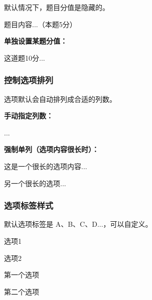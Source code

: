 默认情况下，题目分值是隐藏的。

\begin{latexcode}

  \begin{question}[points = 5]
    题目内容...（本题5分）
  \end{question}
\end{latexcode}

\textbf{单独设置某题分值：}

\begin{latexcode}
  \begin{question}[points = 10]
    这道题10分...
  \end{question}
\end{latexcode}

\subsubsection{控制选项排列}

选项默认会自动排列成合适的列数。

\textbf{手动指定列数：}

\begin{latexcode}

  \begin{choices}[columns = 4]  %
    \item ...
  \end{choices}
\end{latexcode}

\textbf{强制单列（选项内容很长时）：}

\begin{latexcode}
  \begin{choices}[columns = 1]
    \item 这是一个很长的选项内容...
    \item 另一个很长的选项...
  \end{choices}
\end{latexcode}

\subsubsection{选项标签样式}

默认选项标签是 A、B、C、D...，可以自定义。

\begin{latexcode}
  \begin{choices}[label = \arabic*.]
    \item 选项1
    \item 选项2
  \end{choices}

  \begin{choices}[label = \circlednumber*]
    \item 第一个选项
    \item 第二个选项
  \end{choices}
\end{latexcode}

